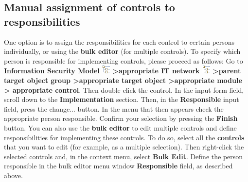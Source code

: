 \documentclass[a4paper,10pt]{book}
\begin{document}
\subsection{Manual assignment of controls to responsibilities}
One option is to assign the responsibilities for each control to certain persons individually, or using the
\textbf{bulk editor} (for multiple controls). To specify which person is responsible for implementing controls,
please proceed as follows:
Go to \textbf{Information Security Model \includegraphics[height=2ex]{Icon/GS_Modell.png}
\textgreater appropriate IT network \includegraphics[height=2ex]{Icon/GS_Modell.png} \textgreater parent target object group
\textgreater appropriate target object \textgreater appropriate module \textgreater
appropriate control}. Then double-click the control. In the input form field, scroll down to the \textbf{Implementation}
section. Then, in the \textbf{Responsible} input field, press the change... button. In the menu that then appears check the
appropriate person responsible. Confirm your selection by pressing the \textbf{Finish} button.
\newline
You can also use the \textbf{bulk editor} to edit multiple controls and define responsibilities for implementing these controls.
To do so, select all the \textbf{controls} that you want to edit (for example, as a multiple selection). Then right-click the selected
controls and, in the context menu, select \textbf{Bulk Edit}. Define the person responsible in the bulk editor menu window
\textbf{Responsible} field, as described above.
\end{document}
